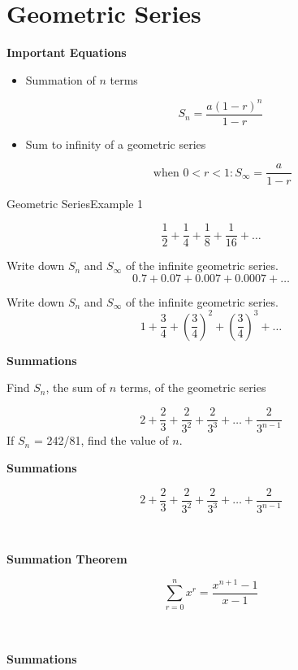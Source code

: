 \documentclass[12pt]{article}
\begin{document}
\section{Geometric Series}

\textbf{Important Equations}
\begin{itemize}
\item Summation of $n$ terms
{

\[ S_n = \frac{a(1-r)^n}{1-r} \]
}
\item Sum to infinity of a geometric series
{

\[ \mbox{ when } 0 < r < 1 : S_{\infty} = \frac{a}{1-r} \]
}
\end{itemize}


{Geometric Series}{Example 1}


\[ \frac{1}{2} + \frac{1}{4} + \frac{1}{8} +  \frac{1}{16} +\ldots  \]

Write down $S_n$ and $S_{\infty}$ of the infinite geometric series.
\[ 0.7 + 0.07 + 0.007 + 0.0007 + \ldots  \]




Write down $S_n$ and $S_{\infty}$ of the infinite geometric series.
\[ 1 + \frac{3}{4} + \left( \frac{3}{4} \right)^2 + \left( \frac{3}{4} \right)^3 + \ldots  \]

\noindent\textbf{Summations}


Find $S_n$, the sum of $n$ terms, of the geometric series

\[  2 + \frac{2}{3} + \frac{2}{3^2} + \frac{2}{3^3} +  \ldots + \frac{2}{3^{n-1}} \]
\bigskip
If $S_n$ = 242/81, find the value of $n$.





\noindent\textbf{Summations}

\[  2 + \frac{2}{3} + \frac{2}{3^2} + \frac{2}{3^3} +  \ldots + \frac{2}{3^{n-1}} \]
\[ \phantom{ 2 \times \left[ 1 + \frac{1}{3} + \frac{1}{3^2} + \frac{1}{3^3} +  \ldots + \frac{1}{3^{n-1}}   \right]  } \]


\textbf{Summation Theorem}

\[ \sum^{n}_{r=0} x^r = \frac{x^{n+1}-1}{x-1} \]
\[ \phantom{k \sum^{n}_{r=0} x^r = k \frac{x^{n+1}-1}{x-1}  } \]
\phantom{Here $k=2$ and $x = 1/3$ }






\noindent\textbf{Summations}
\end{document}

